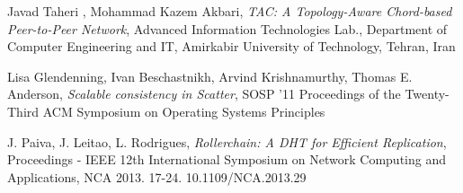 \documentclass[12pt, twoside, openany]{report}
\begin{document}
\begin{thebibliography}{11}
 Javad Taheri , Mohammad Kazem Akbari, \emph{TAC: A Topology-Aware Chord-based Peer-to-Peer Network}, Advanced Information Technologies Lab., Department of Computer Engineering and IT, Amirkabir University of Technology, Tehran, Iran

 Lisa Glendenning, Ivan Beschastnikh, Arvind Krishnamurthy, Thomas E. Anderson, \emph{Scalable consistency in Scatter}, SOSP '11 Proceedings of the Twenty-Third ACM Symposium on Operating Systems Principles

 J. Paiva, J. Leitao, L. Rodrigues, \emph{Rollerchain: A DHT for Efficient Replication}, Proceedings - IEEE 12th International Symposium on Network Computing and Applications, NCA 2013. 17-24. 10.1109/NCA.2013.29



\end{thebibliography}
\end{document}
